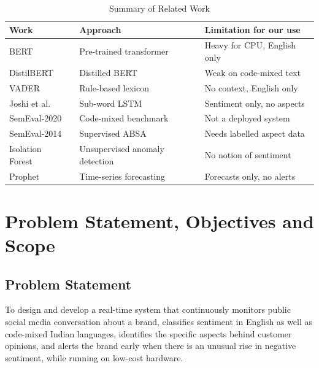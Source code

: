 \documentclass[conference]{IEEEtran}
\begin{document}
\begin{table}[t]
\caption{Summary of Related Work}
\label{tab:lit}
\centering
\footnotesize
\begin{tabular}{>{\raggedright}p{1.6cm} >{\raggedright}p{2.6cm} >{\raggedright\arraybackslash}p{3.1cm}}
\toprule
\textbf{Work} & \textbf{Approach} & \textbf{Limitation for our use} \\
\midrule
BERT~\cite{b1} & Pre-trained transformer & Heavy for CPU, English only \\
DistilBERT~\cite{b2} & Distilled BERT & Weak on code-mixed text \\
VADER~\cite{b3} & Rule-based lexicon & No context, English only \\
Joshi et al.~\cite{b4} & Sub-word LSTM & Sentiment only, no aspects \\
SemEval-2020~\cite{b5} & Code-mixed benchmark & Not a deployed system \\
SemEval-2014~\cite{b6} & Supervised ABSA & Needs labelled aspect data \\
Isolation Forest~\cite{b7} & Unsupervised anomaly detection & No notion of sentiment \\
Prophet~\cite{b8} & Time-series forecasting & Forecasts only, no alerts \\
\bottomrule
\end{tabular}
\end{table}

\section{Problem Statement, Objectives and Scope}

\subsection{Problem Statement}
To design and develop a real-time system that continuously monitors public social media conversation
about a brand, classifies sentiment in English as well as code-mixed Indian languages, identifies the
specific aspects behind customer opinions, and alerts the brand early when there is an unusual rise
in negative sentiment, while running on low-cost hardware.
\end{document}
